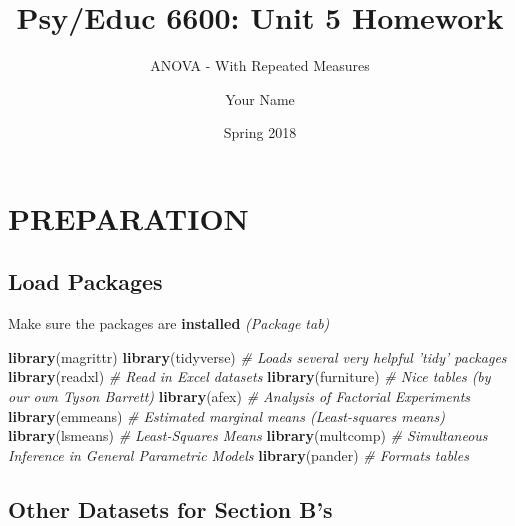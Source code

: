 \documentclass[]{article}
\title{Psy/Educ 6600: Unit 5 Homework}
\subtitle{ANOVA - With Repeated Measures}
\author{Your Name}
\date{Spring 2018}
\newenvironment{Shaded}{\begin{snugshade}}{\end{snugshade}}
\newcommand{\KeywordTok}[1]{\textcolor[rgb]{0.13,0.29,0.53}{\textbf{#1}}}
\newcommand{\CommentTok}[1]{\textcolor[rgb]{0.56,0.35,0.01}{\textit{#1}}}
\newcommand{\NormalTok}[1]{#1}
\begin{document}
\maketitle

{
\setcounter{tocdepth}{3}
\tableofcontents
}
\section{PREPARATION}\label{preparation}

\subsection{Load Packages}\label{load-packages}

Make sure the packages are \textbf{installed} \emph{(Package tab)}

\begin{Shaded}
\begin{Highlighting}[]
\KeywordTok{library}\NormalTok{(magrittr)}
\KeywordTok{library}\NormalTok{(tidyverse)    }\CommentTok{# Loads several very helpful 'tidy' packages}
\KeywordTok{library}\NormalTok{(readxl)       }\CommentTok{# Read in Excel datasets}
\KeywordTok{library}\NormalTok{(furniture)    }\CommentTok{# Nice tables (by our own Tyson Barrett)}
\KeywordTok{library}\NormalTok{(afex)         }\CommentTok{# Analysis of Factorial Experiments}
\KeywordTok{library}\NormalTok{(emmeans)      }\CommentTok{# Estimated marginal means (Least-squares means)}
\KeywordTok{library}\NormalTok{(lsmeans)      }\CommentTok{# Least-Squares Means}
\KeywordTok{library}\NormalTok{(multcomp)     }\CommentTok{# Simultaneous Inference in General Parametric Models }
\KeywordTok{library}\NormalTok{(pander)       }\CommentTok{# Formats tables }
\end{Highlighting}
\end{Shaded}

\clearpage

\subsection{Other Datasets for Section
B's}\label{other-datasets-for-section-bs}
\end{document}
